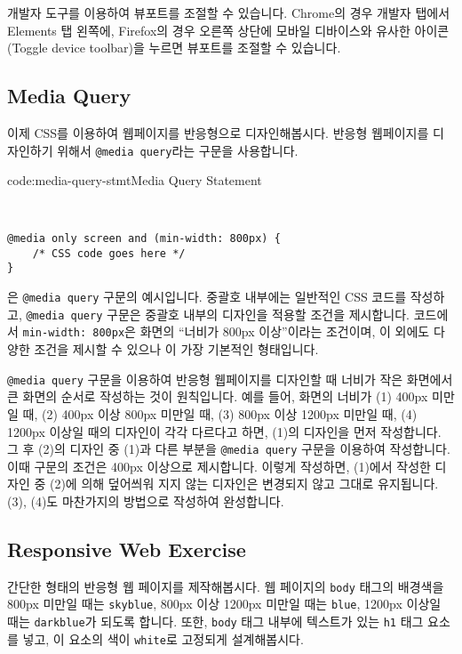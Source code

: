 개발자 도구를 이용하여 뷰포트를 조절할 수 있습니다. Chrome의 경우 개발자 탭에서 Elements 탭 왼쪽에, Firefox의 경우 오른쪽 상단에 모바일 디바이스와 유사한 아이콘(Toggle device toolbar)을 누르면 뷰포트를 조절할 수 있습니다. 

\subsection*{Media Query}
이제 CSS를 이용하여 웹페이지를 반응형으로 디자인해봅시다. 반응형 웹페이지를 디자인하기 위해서 \texttt{@media query}라는 구문을 사용합니다. 

\begin{codeenv}{code:media-query-stmt}{Media Query Statement}\begin{verbatim}


@media only screen and (min-width: 800px) {
    /* CSS code goes here */   
}
\end{verbatim}
\end{codeenv}

은 \texttt{@media query} 구문의 예시입니다. 중괄호 내부에는 일반적인 CSS 코드를 작성하고, \texttt{@media query} 구문은 중괄호 내부의 디자인을 적용할 조건을 제시합니다. 코드에서 \texttt{min-width: 800px}은 화면의 ``너비가 800px 이상''이라는 조건이며, 이 외에도 다양한 조건을 제시할 수 있으나 이 가장 기본적인 형태입니다. 

\texttt{@media query} 구문을 이용하여 반응형 웹페이지를 디자인할 때 너비가 작은 화면에서 큰 화면의 순서로 작성하는 것이 원칙입니다. 예를 들어, 화면의 너비가 (1) 400px 미만일 때, (2) 400px 이상 800px 미만일 때, (3) 800px 이상 1200px 미만일 때, (4) 1200px 이상일 때의 디자인이 각각 다르다고 하면, (1)의 디자인을 먼저 작성합니다. 그 후 (2)의 디자인 중 (1)과 다른 부분을 \texttt{@media query} 구문을 이용하여 작성합니다. 이때 구문의 조건은 400px 이상으로 제시합니다. 이렇게 작성하면, (1)에서 작성한 디자인 중 (2)에 의해 덮어씌워 지지 않는 디자인은 변경되지 않고 그대로 유지됩니다. (3), (4)도 마찬가지의 방법으로 작성하여 완성합니다. 

\subsection*{Responsive Web Exercise}
간단한 형태의 반응형 웹 페이지를 제작해봅시다. 웹 페이지의 \texttt{body} 태그의 배경색을 800px 미만일 때는 \texttt{skyblue}, 800px 이상 1200px 미만일 때는 \texttt{blue}, 1200px 이상일 때는 \texttt{darkblue}가 되도록 합니다. 또한, \texttt{body} 태그 내부에 텍스트가 있는 \texttt{h1} 태그 요소를 넣고, 이 요소의 색이 \texttt{white}로 고정되게 설계해봅시다. 

